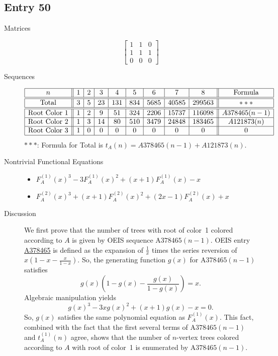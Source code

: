 \documentclass[12pt]{amsart}
\newcommand{\seqnum}[1]{\href{https://oeis.org/#1}{#1}}
\newcommand{\gff}[2]{F_{#2}^{(#1)}(x)}
\newcommand{\gfa}[1]{\gff{#1}{A}}
\begin{document}
\subsection*{Entry 50}
\begin{description}
    \item[Matrices]
    
    \[\begin{bmatrix}
1 & 1 & 0 \\
1 & 1 & 1 \\
0 & 0 & 0
\end{bmatrix}\]
    \item[Sequences]\hspace*{\fill}\vspace{-0.5cm}
    \begin{center}
        \[
        \begin{array}{|c||c|c|c|c|c|c|c|c||c|}\hline
           n  & 1 & 2 & 3 & 4 & 5 & 6 & 7 & 8  & \text{Formula}\\\hline\hline
           \text{Total}  & 3 & 5 & 23 & 131 & 834 & 5685 & 40585 & 299563 & *** \\\hline\hline
           \text{Root Color }1 & 1 & 2 & 9 & 51 & 324 & 2206 & 15737 & 116098 & A378465(n-1) \\\hline
           \text{Root Color }2 & 1 & 3 & 14 & 80 & 510 & 3479 & 24848 & 183465 & A121873(n)\\\hline
           \text{Root Color }3 & 1 & 0 & 0 & 0 & 0 & 0 & 0 & 0 & 0\\\hline
        \end{array}
        \]
        $***$: Formula for Total is $t_A(n)=A378465(n-1) + A121873(n)$.
    \end{center}
    
    \item[Nontrivial Functional Equations]\hspace*{\fill}

    \begin{itemize}
\item $\gfa{1}^3-3\gfa{1}^2+(x + 1)\gfa{1}-x$


\item $\gfa{2}^3+(x + 1)\gfa{2}^2+(2x - 1)\gfa{2}+x$


\end{itemize}
    \item[Discussion] 
    We first prove that the number of trees with root of color~1 colored according to $A$ is given by OEIS sequence $\text{A378465}(n-1)$. OEIS entry \seqnum{A378465} is defined as the expansion of $\frac{1}{x}$ times the series reversion of $x\left(1-x-\frac{x}{1-x}\right)$. So, the generating function $g(x)$ for $\text{A378465}(n-1)$ satisfies
    \[
    g(x)\left(1-g(x)-\frac{g(x)}{1-g(x)}\right)=x.
    \]
    Algebraic manipulation yields
    \[
    g(x)^3-3xg(x)^2+(x+1)g(x)-x=0.
    \]
    So, $g(x)$ satisfies the same polynomial equation as $\gfa{1}$. This fact, combined with the fact that the first several terms of $\text{A378465}(n-1)$ and $t_A^{(1)}(n)$ agree, shows that the number of $n$-vertex trees colored according to $A$ with root of color~1 is enumerated by $\text{A378465}(n-1)$.
    


\end{description}
\end{document}
